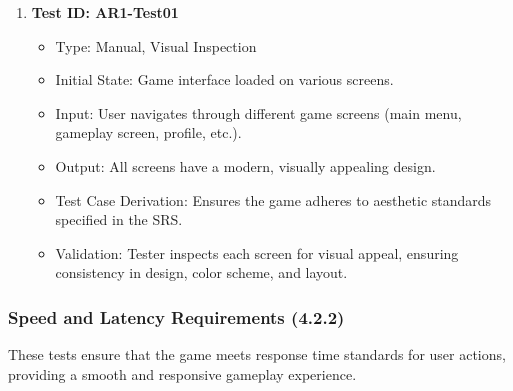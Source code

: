 \documentclass[12pt, titlepage]{article}
\begin{document}
\begin{enumerate}
    \item \textbf{Test ID: AR1-Test01}
        \begin{itemize}
            \item Type: Manual, Visual Inspection
            \item Initial State: Game interface loaded on various screens.
            \item Input: User navigates through different game screens (main menu, gameplay screen, profile, etc.).
            \item Output: All screens have a modern, visually appealing design.
            \item Test Case Derivation: Ensures the game adheres to aesthetic standards specified in the SRS.
            \item Validation: Tester inspects each screen for visual appeal, ensuring consistency in design, color scheme, and layout.
        \end{itemize}
\end{enumerate}

\subsubsection{Speed and Latency Requirements (4.2.2)}

These tests ensure that the game meets response time standards for user actions, providing a smooth and responsive gameplay experience.
\end{document}
